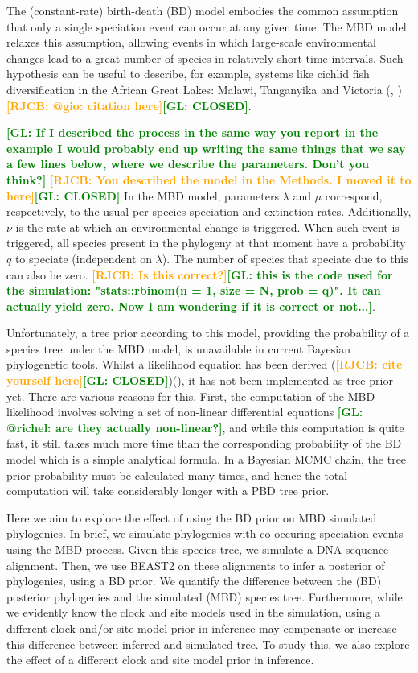 \documentclass{article}
\newcommand*\richel[1]{\textcolor{orange}{\textbf{[RJCB: #1]}}}
\newcommand*\gio[1]{\textcolor{green}{\textbf{[GL: #1]}}}
\begin{document}
The (constant-rate) birth-death (BD) model embodies the common assumption that 
only a single speciation event can occur at any given time.
The MBD model relaxes this assumption, allowing events in which 
large-scale environmental changes lead to a great number of species 
in relatively short time intervals. Such hypothesis can be useful to describe, for example, 
systems like cichlid fish diversification in the 
African Great Lakes: Malawi, Tanganyika and Victoria (\cite{janzen2016}, \cite{janzen2017})\richel{@gio: citation here}\gio{CLOSED}.

\gio{If I described the process in the same way you report in the example I would probably end up writing the same things that we say a few lines below, where we describe the parameters. Don't you think?}
\richel{You described the model in the Methods. I moved it to here}\gio{CLOSED}
In the MBD model, parameters $\lambda$ and $\mu$ correspond, respectively, 
to the usual per-species speciation and extinction rates. 
Additionally, $\nu$ is the rate at which an environmental change is triggered.
When such event is triggered, all species present in the phylogeny at that moment
have a probability $q$ to speciate (independent on $\lambda$).
The number of species that speciate due to this can also be zero. 
\richel{Is this correct?}\gio{this is the code used for the simulation: "stats::rbinom(n = 1, size = N, prob = q)". It can actually yield zero. Now I am wondering if it is correct or not...}.

Unfortunately, a tree prior according to this model, 
providing the probability of a species tree under the MBD model, 
is unavailable in current Bayesian phylogenetic tools. 
Whilst a likelihood equation has been derived (\richel{cite yourself here}\gio{CLOSED})(\cite{mbd}),
it has not been implemented as tree prior yet. 
There are various reasons for this.
First, the computation of the MBD likelihood involves solving a set of 
non-linear differential equations \gio{@richel: are they actually non-linear?}, and while this computation is quite fast, 
it still takes much more time than the corresponding probability 
of the BD model which is a simple analytical formula. 
In a Bayesian MCMC chain, the tree prior probability must be calculated many times, 
and hence the total computation will take considerably longer with a PBD tree prior. 

Here we aim to explore the effect of using the
BD prior on MBD simulated phylogenies.
In brief, we simulate phylogenies with co-occuring speciation events using the MBD process. 
Given this species tree, we simulate a DNA sequence alignment. Then, we use BEAST2 on these alignments
to infer a posterior of phylogenies, using a BD prior. We quantify the difference
between the (BD) posterior phylogenies and the simulated (MBD) species tree.
Furthermore, while we evidently know the clock and site models used in the simulation, 
using a different clock and/or site model prior in inference 
may compensate or increase this difference between inferred and simulated tree. 
To study this, we also explore the effect of 
a different clock and site model prior in inference.
\end{document}
